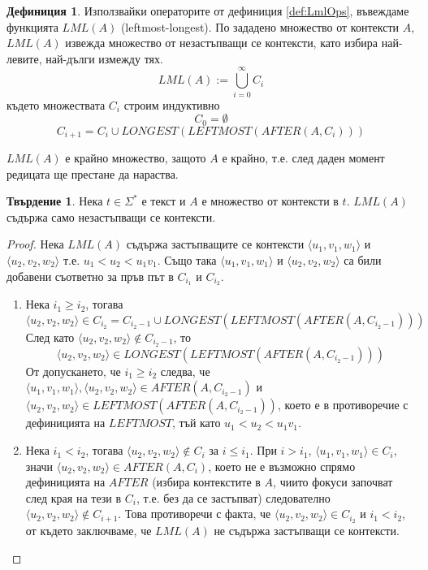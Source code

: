 \documentclass[12pt, oneside]{article}
\theoremstyle{definition}
\newtheorem{definition}{Дефиниция}[section]
\newtheorem{proposition}{Твърдение}[section]
\begin{document}
\begin{definition}
	Използвайки операторите от дефиниция \ref{def:LmlOps}, въвеждаме функцията \( LML(A) \) (leftmost-longest). По зададено множество от контексти \(A\), \( LML(A) \) извежда множество от незастъпващи се контексти, като избира най-левите, най-дълги измежду тях.
	\[ LML(A) := \bigcup\limits_{i=0}^{\infty} C_{i} \]
	където множествата \( C_i \) строим индуктивно
	\[ C_0 = \emptyset \]
	\[ C_{i+1} = C_i \cup LONGEST(LEFTMOST(AFTER(A, C_i))) \]

	\noindent \( LML(A) \) е крайно множество, защото \( A \) е крайно, т.е. след даден момент редицата ще престане да нараства.
\end{definition}

\begin{proposition}
	Нека \( t \in \Sigma^* \) е текст и \(A\) е множество от контексти в \(t\). \( LML(A) \) съдържа само незастъпващи се контексти.

	\begin{proof}
		Нека \( LML(A) \) съдържа застъпващите се контексти \( \langle u_1, v_1, w_1 \rangle \) и \( \langle u_2, v_2, w_2 \rangle \) т.е. \( u_1 < u_2 < u_1v_1 \). Също така \( \langle u_1, v_1, w_1 \rangle \) и \( \langle u_2, v_2, w_2 \rangle \) са били добавени съответно за пръв път в \( C_{i_1} \text{ и } C_{i_2} \).
		\begin{enumerate}
			\item Нека \( i_1 \geq i_2 \), тогава
			\[ \langle u_2, v_2, w_2 \rangle \in C_{i_2} = C_{i_2-1} \cup LONGEST(LEFTMOST(AFTER(A, C_{i_2-1}))) \]
			\noindent След като \( \langle u_2, v_2, w_2 \rangle \notin C_{i_2-1} \), то 
			\[ \langle u_2, v_2, w_2 \rangle \in LONGEST(LEFTMOST(AFTER(A, C_{i_2-1}))) \]
			От допускането, че \( i_1 \geq i_2 \) следва, че \( \langle u_1, v_1, w_1 \rangle, \langle u_2, v_2, w_2 \rangle \in AFTER(A,C_{i_2-1}) \) и \( \langle u_2, v_2, w_2 \rangle \in LEFTMOST(AFTER(A,C_{i_2-1})) \), което е в противоречие с дефиницията на \( LEFTMOST \), тъй като \( u_1 < u_2 < u_1v_1 \).

			\item Нека \( i_1 < i_2 \), тогава \( \langle u_2, v_2, w_2 \rangle \notin C_i \) за \( i \leq i_1 \). При \( i > i_1 \), \( \langle u_1, v_1, w_1 \rangle \in C_i \), значи \( \langle u_2, v_2, w_2 \rangle \in AFTER(A, C_i) \), което не е възможно спрямо дефиницията на \( AFTER \) (избира контекстите в \(A\), чиито фокуси започват след края на тези в \(C_i\), т.е. без да се застъпват) следователно \( \langle u_2, v_2, w_2 \rangle \notin C_{i+1} \). Това противоречи с факта, че \( \langle u_2, v_2, w_2 \rangle \in C_{i_2} \) и \(i_1 < i_2 \), от където заключваме, че \( LML(A) \) не съдържа застъпващи се контексти.
		\end{enumerate}
	\end{proof}
\end{proposition}
\end{document}
